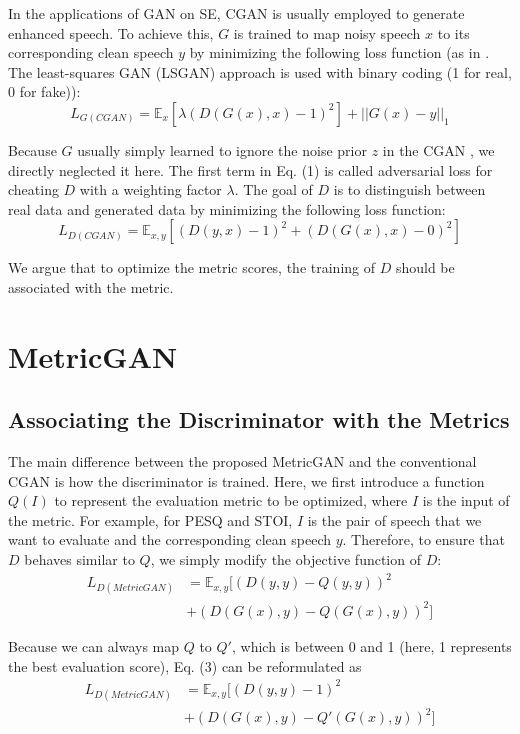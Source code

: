 \documentclass{article}
\begin{document}
In the applications of GAN on SE, CGAN is usually employed to generate enhanced speech. To achieve this, $G$ is trained to map noisy speech $x$ to its corresponding clean speech $y$ by minimizing the following loss function (as in \cite{pascual2017segan}. The least-squares GAN (LSGAN) approach \cite{mao2017least} is used with binary coding (1 for real, 0 for fake)):
\begin{equation}
L_{G (CGAN)}= \mathbb{E}_{x} [\lambda(D(G(x), x) - 1)^2]+ ||G(x) - y||_{1}
\end{equation}

Because $G$ usually simply learned to ignore the noise prior $z$ in the CGAN \cite{isola2017image}, we directly neglected it here. The first term in Eq. (1) is called adversarial loss for cheating $D$ with a weighting factor $\lambda$. The goal of $D$ is to distinguish between real data and generated data by minimizing the following loss function:
\begin{equation}
L_{D (CGAN)}= \mathbb{E}_{x,y} [(D(y, x) - 1)^2+(D(G(x), x) -0)^2]
\end{equation}

We argue that to optimize the metric scores, the training of $D$ should be associated with the metric.  

\section{MetricGAN}
\subsection{Associating the Discriminator with the Metrics}
The main difference between the proposed MetricGAN and the conventional CGAN is how the discriminator is trained. Here, we first introduce a function $Q (I)$ to represent the evaluation metric to be optimized, where $I$ is the input of the metric. For example, for PESQ and STOI, $I$ is the pair of speech that we want to evaluate and the corresponding clean speech $y$. Therefore, to ensure that $D$ behaves similar to $Q$, we simply modify the objective function of $D$:
\begin{equation}
\begin{aligned}
L_{D (MetricGAN)}&= \mathbb{E}_{x,y} [(D(y, y) - Q(y, y))^2
\\ &+(D(G(x), y) - Q(G(x), y))^2]
\end{aligned}
\end{equation}

Because we can always map $Q$ to $Q'$, which is between 0 and 1 (here, 1 represents the best evaluation score), Eq. (3) can be reformulated as
\begin{equation}
\begin{aligned}
L_{D (MetricGAN)}&= \mathbb{E}_{x,y} [(D(y, y) - 1)^2
\\ &+(D(G(x), y) - Q'(G(x), y))^2]
\end{aligned}
\end{equation}
\end{document}
